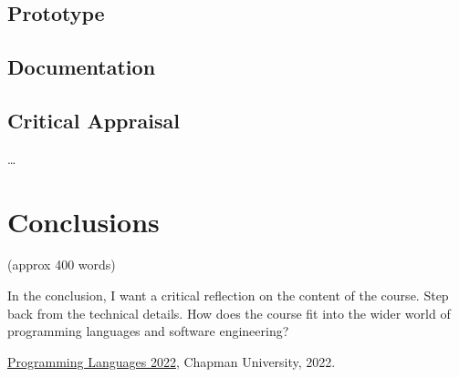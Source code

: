 \documentclass{article}
\theoremstyle{theorem}
\theoremstyle{definition}
\theoremstyle{remark}
\begin{document}
\subsection{Prototype}
\subsection{Documentation}
\subsection{Critical Appraisal}
  
\ldots

\section{Conclusions}\label{conclusions}

(approx 400 words)

In the conclusion, I want a critical reflection on the content of the course. Step back from the technical details. How does the course fit into the wider world of programming languages and software engineering?

\begin{thebibliography}{99}
 \href{https://github.com/alexhkurz/programming-languages-2022/blob/main/README.md}{Programming Languages 2022}, Chapman University, 2022.
\end{thebibliography}
\end{document}
